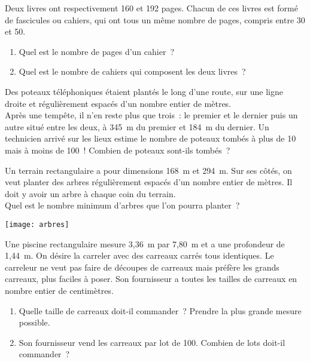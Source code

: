 \begin{exercice}[Pages]
Deux livres ont respectivement 160 et 192 pages. Chacun de ces livres est formé de fascicules ou cahiers, qui ont tous un même nombre de pages, compris entre 30 et 50.
\begin{enumerate}
 \item Quel est le nombre de pages d'un cahier ?
 \item Quel est le nombre de cahiers qui composent les deux livres ?
 \end{enumerate}
\end{exercice}


\begin{exercice}[Tempête]
Des poteaux téléphoniques étaient plantés le long d'une route, sur une ligne droite et régulièrement espacés d'un nombre entier de mètres. \\[0.5em]
Après une tempête, il n'en reste plus que trois : le premier et le dernier puis un autre situé entre les deux, à 345 m du premier et 184 m du dernier. Un technicien arrivé sur les lieux estime le nombre de poteaux tombés à plus de 10 mais à moins de 100 ! Combien de poteaux sont-ils tombés ?
\end{exercice}

\begin{exercice}[Arbres]
Un terrain rectangulaire a pour dimensions 168 m et 294 m. Sur ses côtés, on veut planter des arbres régulièrement espacés d'un nombre entier de mètres. Il doit y avoir un arbre à chaque coin du terrain. \\[0.5em]
Quel est le nombre minimum d'arbres que l'on pourra planter ?
\begin{center} \texttt{[image: arbres]} \end{center}
\end{exercice}


\begin{exercice}[Piscine]
Une piscine rectangulaire mesure 3,36 m par 7,80 m et a une profondeur de 1,44 m. On désire la carreler avec des carreaux carrés tous identiques. Le carreleur ne veut pas faire de découpes de carreaux mais préfère les grands carreaux, plus faciles à poser. Son fournisseur a toutes les tailles de carreaux en nombre entier de centimètres.
\begin{enumerate}
 \item Quelle taille de carreaux doit-il commander ? Prendre la plus grande mesure possible.
 \item Son fournisseur vend les carreaux par lot de 100. Combien de lots doit-il commander ?
 \end{enumerate}
\end{exercice}


